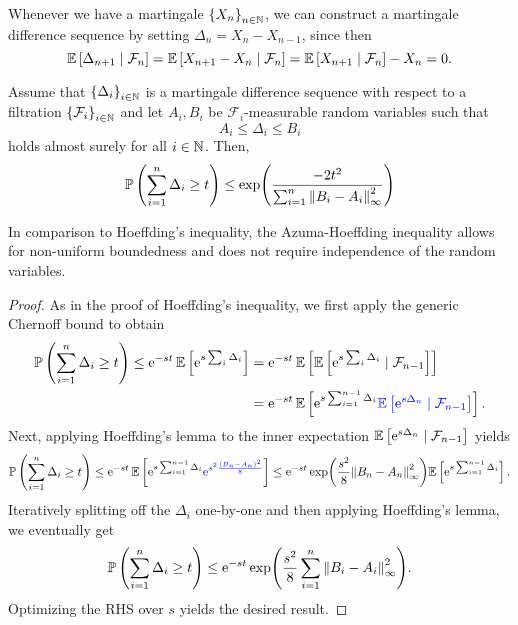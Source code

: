 Whenever we have a martingale $\left\{X_n\right\}_{n\in\mathbb{N}}$, we can construct a martingale difference sequence by setting $\Delta_n = X_n - X_{n-1}$, since then
\[
    \mathbb{E}\left[\Delta_{n+1} \mathrel{|} \mathcal{F}_n\right] = \mathbb{E}\left[X_{n+1} - X_n \mathrel{|} \mathcal{F}_n\right] = \mathbb{E}\left[X_{n+1} \mathrel{|} \mathcal{F}_n\right] - X_n = 0.
\]

\begin{theorem}
\label{thm: azuma-hoeffding}
Assume that $\left\{\Delta_i\right\}_{i\in\mathbb{N}}$ is a martingale difference sequence with respect to a filtration $\left\{\mathcal{F}_i\right\}_{i\in\mathbb{N}}$ and let $A_i, B_i$ be $\mathcal{F}_i$-measurable random variables such that
\[
    A_i \leq \Delta_i \leq B_i
\]
holds almost surely for all $i \in \mathbb{N}$. Then,
\[
    \mathbb{P}\left(\sum_{i=1}^n \Delta_i \geq t\right) \leq \exp(\frac{-2t^2}{\sum_{i=1}^n \norm{B_i - A_i}_\infty^2})
\]
\end{theorem}

In comparison to Hoeffding’s inequality, the Azuma-Hoeffding inequality allows for non-uniform boundedness and does not require independence of the random variables.

\begin{proof}
As in the proof of Hoeffding's inequality, we first apply the generic Chernoff bound to obtain
\begin{align*}
    \mathbb{P}\left(\sum_{i=1}^n \Delta_i \geq t\right) \leq \mathrm{e}^{-st} \, \mathbb{E}\left[\mathrm{e}^{s\sum_i \Delta_i}\right] &= \mathrm{e}^{-st} \, \mathbb{E}\left[\mathbb{E}\left[\mathrm{e}^{s\sum_i \Delta_i} \mathrel{|} \mathcal{F}_{n-1}\right]\right] \\
        &= \mathrm{e}^{-st} \, \mathbb{E}\left[\mathrm{e}^{s\sum_{i=1}^{n-1} \Delta_i} {\color{blue} \mathbb{E}\left[\mathrm{e}^{s\Delta_n} \mathrel{|} \mathcal{F}_{n-1}\right]}\right].
\end{align*}
Next, applying Hoeffding's lemma to the inner expectation $\mathbb{E}\left[\mathrm{e}^{s\Delta_n} \mathrel{|} \mathcal{F}_{n-1}\right]$ yields
\[
    \mathbb{P}\left(\sum_{i=1}^n \Delta_i \geq t\right) \leq \mathrm{e}^{-st} \, \mathbb{E}\left[\mathrm{e}^{s\sum_{i=1}^{n-1} \Delta_i} {\color{blue} \mathrm{e}^{s^2\frac{(B_n - A_n)^2}{8}}}\right] \leq \mathrm{e}^{-st} \exp(\frac{s^2}{8}\norm{B_n - A_n}^2_\infty) \mathbb{E}\left[\mathrm{e}^{s\sum_{i=1}^{n-1} \Delta_i}\right].
\]
Iteratively splitting off the $\Delta_i$ one-by-one and then applying Hoeffding's lemma, we eventually get
\[
    \mathbb{P}\left(\sum_{i=1}^n \Delta_i \geq t\right) \leq \mathrm{e}^{-st} \exp(\frac{s^2}{8}\sum_{i=1}^n \norm{B_i - A_i}_\infty^2).
\]
Optimizing the RHS over $s$ yields the desired result.
\end{proof}
